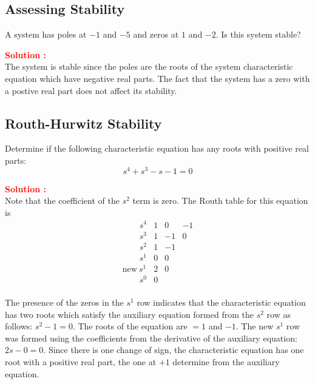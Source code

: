 \documentclass[12pt]{article}
\begin{document}

\clearpage
\subsection{Assessing Stability}

A system has poles at \(-1\) and \(-5\) and zeros at \(1\) and \(-2\). Is this system stable?

\textbf{\textcolor{red}{Solution :}} \\
The system is stable since the poles are the roots of the system characteristic equation which have negative real parts. The fact that the system has a zero with a postive real part does not affect its stability.

\clearpage
\subsection{Routh-Hurwitz Stability}

Determine if the following characteristic equation has any roots with positive real parts:
\begin{equation}
    s^4+s^3-s-1 = 0
\end{equation}

\textbf{\textcolor{red}{Solution :}} \\
Note that the coefficient of the \(s^2\) term is zero. The Routh table for this equation is 
\[
\begin{array}{l|ccc}
\quad \quad s^4 & 1 & 0 & -1 \\
\quad \quad s^3 & 1 & -1 & 0 \\
\quad \quad s^2 & 1 & -1 & \\
\quad \quad s^1 & 0 & 0 & \\
\text{new} \ s^1 & 2 & 0 & \\
\quad \quad s^0 & 0 & & \\
\end{array}
\]

The presence of the zeros in the \(s^1\) row indicates that the characteristic equation has two roots which satisfy the auxiliary equation formed from the \(s^2\) row as follows: \(s^2-1 = 0\). The roots of the equation are \(=1\) and \(-1\).
The new \(s^1\) row was formed using the coefficients from the derivative of the auxiliary equation: \(2s-0 = 0\). Since there is one change of sign, the characteristic equation has one root with a positive real part, the one at \(+1\) determine from the auxiliary equation.

\clearpage
\end{document}
